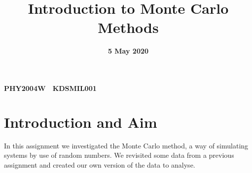 \documentclass[12pt]{article}
\title{Introduction to Monte Carlo Methods}
\date{\textbf{5 May 2020}}
\author{}
\begin{document}
    \begin{titlepage}
        \maketitle
        \center
        \textbf{\large{PHY2004W}}\ \
        \textbf{\large{KDSMIL001}}\ \
        \tableofcontents
    \end{titlepage}

    \section{Introduction and Aim}
    In this assignment we investigated the Monte Carlo method, a way of simulating systems by 
    use of random numbers. We revisited some data from a previous assignment and created our 
    own version of the data to analyse.
\end{document}
